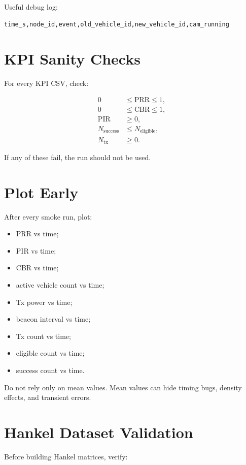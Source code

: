 \documentclass[11pt]{article}
\begin{document}
Useful debug log:

\begin{lstlisting}
time_s,node_id,event,old_vehicle_id,new_vehicle_id,cam_running
\end{lstlisting}

\section{KPI Sanity Checks}

For every KPI CSV, check:

\begin{align}
0 &\leq \mathrm{PRR} \leq 1, \\
0 &\leq \mathrm{CBR} \leq 1, \\
\mathrm{PIR} &\geq 0, \\
N_{\mathrm{success}} &\leq N_{\mathrm{eligible}}, \\
N_{\mathrm{tx}} &\geq 0.
\end{align}

If any of these fail, the run should not be used.

\section{Plot Early}

After every smoke run, plot:

\begin{itemize}
    \item PRR vs time;
    \item PIR vs time;
    \item CBR vs time;
    \item active vehicle count vs time;
    \item Tx power vs time;
    \item beacon interval vs time;
    \item Tx count vs time;
    \item eligible count vs time;
    \item success count vs time.
\end{itemize}

Do not rely only on mean values. Mean values can hide timing bugs, density effects, and transient errors.

\section{Hankel Dataset Validation}

Before building Hankel matrices, verify:
\end{document}
